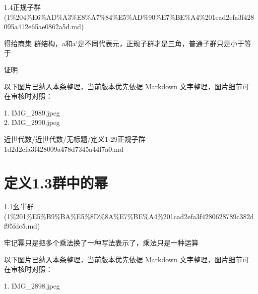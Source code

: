 \begin{note}[来源上级主题]

1.4正规子群 (1\%204\%E6\%AD\%A3\%E8\%A7\%84\%E5\%AD\%90\%E7\%BE\%A4\%201ead2efa3f428095a412e65ae0862a5d.md)

\end{note}

\begin{definition}[定义1.29正规子群]

得给商集 群结构，a和a‘是不同代表元，正规子群才是三角，普通子群只是小于等于

证明

\end{definition}

\begin{note}[关联图片]
以下图片已纳入本条整理，当前版本优先依据 Markdown 文字整理，图片细节可在审核时对照：

1. IMG\_2989.jpeg\\
2. IMG\_2990.jpeg\\

\end{note}

\begin{note}[来源路径]

近世代数/近世代数/无标题/定义1 29正规子群 1d2d2efa3f428009a478d7345a44f7a0.md

\end{note}

\section*{定义1.3群中的幂}

\begin{note}[来源上级主题]

1.1幺半群 (1\%201\%E5\%B9\%BA\%E5\%8D\%8A\%E7\%BE\%A4\%201cad2efa3f4280628789c382df95fdc5.md)

\end{note}

\begin{definition}[定义1.3群中的幂]

牢记幂只是把多个乘法换了一种写法表示了，乘法只是一种运算

\end{definition}

\begin{note}[关联图片]
以下图片已纳入本条整理，当前版本优先依据 Markdown 文字整理，图片细节可在审核时对照：

1. IMG\_2898.jpeg\\

\end{note}

